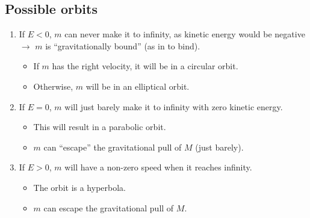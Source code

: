 \documentclass[aspectratio=169,
hyperref={colorlinks,urlcolor=blue}
]{beamer}
\begin{document}
\subsection{Possible orbits}
\label{subsec:possibleorbits}
{
\begin{enumerate}
\item If $E<0$, $m$ can never make it to infinity, as kinetic energy would be negative $\rightarrow$ $m$ is ``gravitationally bound'' (as in to bind).
\begin{itemize}
\item If $m$ has the right velocity, it will be in a circular orbit.
\item Otherwise, $m$ will be in an elliptical orbit.
\end{itemize}
\item If $E=0$, $m$ will just barely make it to infinity with zero kinetic energy.
\begin{itemize}
\item This will result in a parabolic orbit.
\item $m$ can ``escape'' the gravitational pull of $M$ (just barely).
\end{itemize}
\item If $E>0$, $m$ will have a non-zero speed when it reaches infinity.
\begin{itemize}
\item The orbit is a hyperbola.
\item $m$ can escape the gravitational pull of $M$.
\end{itemize}

\end{enumerate}
}
{
\begin{center}
\end{center}
}
\end{document}
